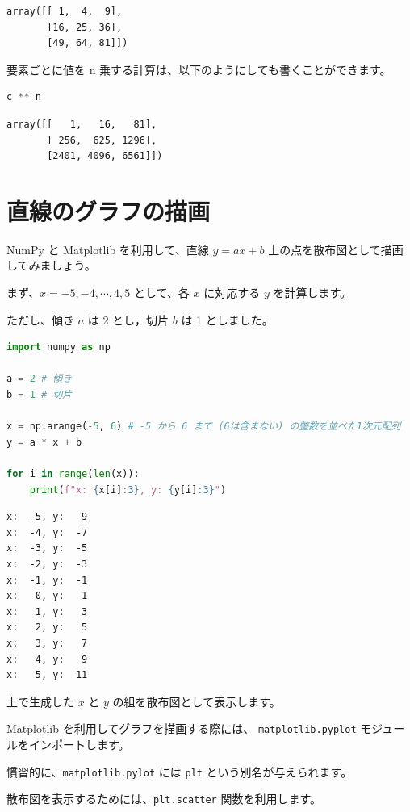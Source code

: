\begin{lstlisting}[style=outputcell]
array([[ 1,  4,  9],
       [16, 25, 36],
       [49, 64, 81]])
\end{lstlisting}

要素ごとに値を n 乗する計算は、以下のようにしても書くことができます。


\begin{lstlisting}[style=codecell,language=Python]
c ** n
\end{lstlisting}

\begin{lstlisting}[style=outputcell]
array([[   1,   16,   81],
       [ 256,  625, 1296],
       [2401, 4096, 6561]])
\end{lstlisting}

\section{直線のグラフの描画}


NumPy と Matplotlib を利用して、直線 $y=ax+b$ 上の点を散布図として描画してみましょう。

まず、$x = -5, -4, \cdots, 4, 5$ として、各 $x$ に対応する $y$ を計算します。

ただし、傾き $a$ は 2 とし，切片 $b$ は 1 としました。


\begin{lstlisting}[style=codecell,language=Python]
import numpy as np

a = 2 # 傾き
b = 1 # 切片

x = np.arange(-5, 6) # -5 から 6 まで (6は含まない) の整数を並べた1次元配列
y = a * x + b

for i in range(len(x)):
    print(f"x: {x[i]:3}, y: {y[i]:3}")
\end{lstlisting}

\begin{lstlisting}[style=outputcell]
x:  -5, y:  -9
x:  -4, y:  -7
x:  -3, y:  -5
x:  -2, y:  -3
x:  -1, y:  -1
x:   0, y:   1
x:   1, y:   3
x:   2, y:   5
x:   3, y:   7
x:   4, y:   9
x:   5, y:  11
\end{lstlisting}

上で生成した $x$ と $y$ の組を散布図として表示します。

Matplotlib を利用してグラフを描画する際には、 \texttt{matplotlib.pyplot} モジュールをインポートします。

慣習的に、\texttt{matplotlib.pylot} には \texttt{plt} という別名が与えられます。


散布図を表示するためには、\texttt{plt.scatter} 関数を利用します。

